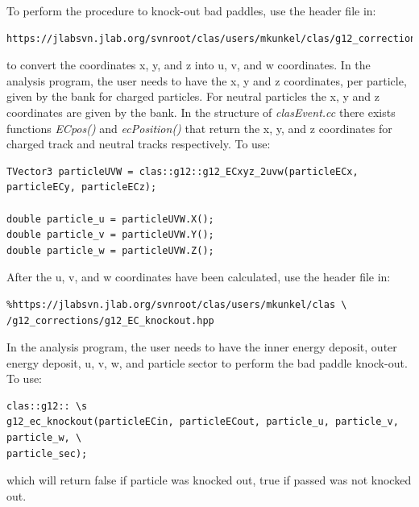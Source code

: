 To perform the procedure to knock-out bad  paddles, use the header file in:
\begin{verbatim}
https://jlabsvn.jlab.org/svnroot/clas/users/mkunkel/clas/g12_corrections/g12_ECxyz_2uvw.hpp
\end{verbatim}
to convert the  coordinates x, y, and z into u, v, and w  coordinates. In the analysis program, the user needs to have the  x, y and z coordinates, per particle, given by the  bank for charged particles. For neutral particles the  x, y and z coordinates are given by the  bank. In the structure of \emph{clasEvent.cc} there exists functions \emph{ECpos()} and \emph{ ecPosition()} that return the  x, y, and z coordinates for charged track and neutral tracks respectively. To use: 
\begin{verbatim}
TVector3 particleUVW = clas::g12::g12_ECxyz_2uvw(particleECx, particleECy, particleECz);

double particle_u = particleUVW.X();
double particle_v = particleUVW.Y();
double particle_w = particleUVW.Z();
\end{verbatim}
After the  u, v, and w coordinates have been calculated, use the header file in:
\begin{verbatim}
%https://jlabsvn.jlab.org/svnroot/clas/users/mkunkel/clas \ 
/g12_corrections/g12_EC_knockout.hpp
\end{verbatim}
In the analysis program, the user needs to have the  inner energy deposit,  outer energy deposit, u, v, w, and particle sector to perform the  bad paddle knock-out. To use:
\begin{verbatim}
clas::g12:: \s
g12_ec_knockout(particleECin, particleECout, particle_u, particle_v, particle_w, \
particle_sec);
\end{verbatim}
which will return false if particle was knocked out, true if passed was not knocked out.
\FloatBarrier
